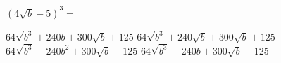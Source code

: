 
\question $(4\sqrt{b} - 5)^3 = $

  \begin{oneparchoices}
    \choice $64\sqrt{b^3} + 240b + 300\sqrt{b} + 125$
    \choice $64\sqrt{b^3} + 240\sqrt{b} + 300\sqrt{b} + 125$
    \choice $64\sqrt{b^3} - 240b^2 + 300\sqrt{b} - 125$
    \CorrectChoice $64\sqrt{b^3} - 240b + 300\sqrt{b} - 125$
  \end{oneparchoices}
